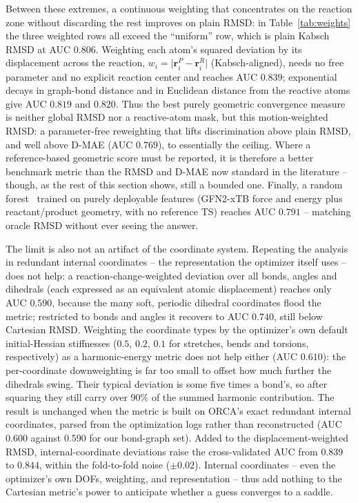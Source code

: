 \documentclass[11pt]{article}
\begin{document}
Between these extremes, a continuous weighting that concentrates on the
reaction zone without discarding the rest improves on plain RMSD: in
Table~\ref{tab:weights} the three weighted rows all exceed the ``uniform'' row,
which is plain Kabsch RMSD at AUC $0.806$. Weighting each atom's squared deviation by its
displacement across the reaction, $w_i = \lvert \mathbf{r}_i^{P}-\mathbf{r}_i^{R}
\rvert$ (Kabsch-aligned), needs no free parameter and no explicit reaction center
and reaches AUC $0.839$; exponential decays in graph-bond distance and in Euclidean
distance from the reactive atoms give AUC $0.819$ and $0.820$. Thus the best purely geometric
convergence measure is neither global RMSD nor a reactive-atom mask, but
this motion-weighted RMSD: a parameter-free reweighting that lifts discrimination
above plain RMSD, and well above D-MAE (AUC $0.769$), to essentially the ceiling.
Where a reference-based geometric score must be reported, it is therefore a better
benchmark metric than the RMSD and D-MAE now standard in the literature -- though,
as the rest of this section shows, still a bounded one. Finally, a
random forest~\cite{Breiman2001} trained on purely deployable features (GFN2-xTB
force and energy plus reactant/product geometry, with no reference TS) reaches
AUC $0.791$ -- matching oracle RMSD without ever seeing the answer.

The limit is also not an artifact of the coordinate system. Repeating the
analysis in redundant internal coordinates -- the representation the optimizer
itself uses -- does not help: a reaction-change-weighted deviation over all
bonds, angles and dihedrals (each expressed as an equivalent atomic displacement)
reaches only AUC $0.590$, because the many soft, periodic dihedral coordinates
flood the metric; restricted to bonds and angles it recovers to AUC $0.740$, still
below Cartesian RMSD. Weighting the coordinate types by the optimizer's own
default initial-Hessian stiffnesses ($0.5$, $0.2$, $0.1$ for stretches, bends and
torsions, respectively) as a harmonic-energy metric does not help either (AUC $0.610$): the
per-coordinate downweighting is far too small to offset how much further the dihedrals
swing. Their typical deviation is some five times a bond's, so after squaring they still
carry over $90\%$ of the summed harmonic contribution. The result is unchanged when the metric is built on ORCA's exact redundant
internal coordinates, parsed from the optimization logs rather than reconstructed
(AUC $0.600$ against $0.590$ for our bond-graph set). Added to the displacement-weighted
RMSD, internal-coordinate deviations raise the cross-validated AUC
from $0.839$ to $0.844$, within the fold-to-fold noise ($\pm 0.02$). Internal
coordinates -- even the optimizer's own DOFs, weighting, and representation --
thus add nothing to the Cartesian metric's power to anticipate whether a guess
converges to a saddle.
\end{document}
